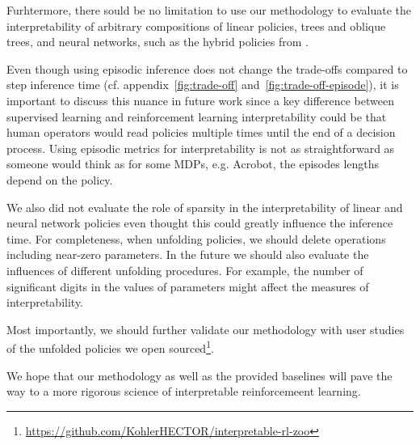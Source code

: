 Furhtermore, there sould be no limitation to use our methodology to evaluate the interpretability of arbitrary compositions of linear policies, trees and oblique trees, and neural networks, such as the hybrid policies from \cite{shindo2024blendrl}.

Even though using episodic inference does not change the trade-offs compared to step inference time (cf. appendix~\ref{fig:trade-off} and~\ref{fig:trade-off-episode}), it is important to discuss this nuance in future work since a key difference between supervised learning and reinforcement learning interpretability could be that human operators would read policies multiple times until the end of a decision process.
Using episodic metrics for interpretability is not as straightforward as someone would think as for some MDPs, e.g. Acrobot, the episodes lengths depend on the policy.

We also did not evaluate the role of sparsity in the interpretability of linear and neural network policies even thought this could greatly influence the inference time.
For completeness, when unfolding policies, we should delete operations including near-zero parameters. 
In the future we should also evaluate the influences of different unfolding procedures.
For example, the number of significant digits in the values of parameters might affect the measures of interpretability.

Most importantly, we should further validate our methodology with user studies of the unfolded policies we open sourced\footnote{\url{https://github.com/KohlerHECTOR/interpretable-rl-zoo}}.

We hope that our methodology as well as the provided baselines will pave the way to a more rigorous science of interpretable reinforcemeent learning.
